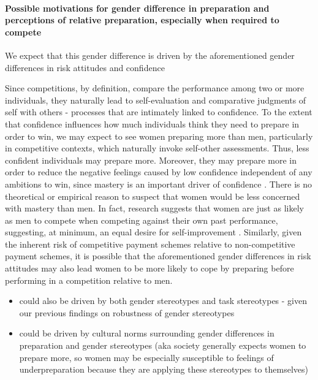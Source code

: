 \documentclass[a4paper, nobind]{templates/ociamthesis}
\providecommand{\tightlist}{%
  \setlength{\itemsep}{0pt}\setlength{\parskip}{0pt}}
\begin{document}
\hypertarget{possible-motivations-for-gender-difference-in-preparation-and-perceptions-of-relative-preparation-especially-when-required-to-compete}{%
\paragraph{Possible motivations for gender difference in preparation and perceptions of relative preparation, especially when required to compete}\label{possible-motivations-for-gender-difference-in-preparation-and-perceptions-of-relative-preparation-especially-when-required-to-compete}}

We expect that this gender difference is driven by the aforementioned gender differences in risk attitudes and confidence

Since competitions, by definition, compare the performance among two or more individuals, they naturally lead to self-evaluation and comparative judgments of self with others - processes that are intimately linked to confidence. To the extent that confidence influences how much individuals think they need to prepare in order to win, we may expect to see women preparing more than men, particularly in competitive contexts, which naturally invoke self-other assessments. Thus, less confident individuals may prepare more. Moreover, they may prepare more in order to reduce the negative feelings caused by low confidence independent of any ambitions to win, since mastery is an important driver of confidence \autocite{Gist1992,Usher2008}. There is no theoretical or empirical reason to suspect that women would be less concerned with mastery than men. In fact, research suggests that women are just as likely as men to compete when competing against their own past performance, suggesting, at minimum, an equal desire for self-improvement \autocite{Apicella2017a}. Similarly, given the inherent risk of competitive payment schemes relative to non-competitive payment schemes, it is possible that the aforementioned gender differences in risk attitudes may also lead women to be more likely to cope by preparing before performing in a competition relative to men.

\begin{itemize}
\tightlist
\item
  could also be driven by both gender stereotypes and task stereotypes - given our previous findings on robustness of gender stereotypes
\item
  could be driven by cultural norms surrounding gender differences in preparation and gender stereotypes (aka society generally expects women to prepare more, so women may be especially susceptible to feelings of underpreparation because they are applying these stereotypes to themselves)
\end{itemize}
\end{document}
